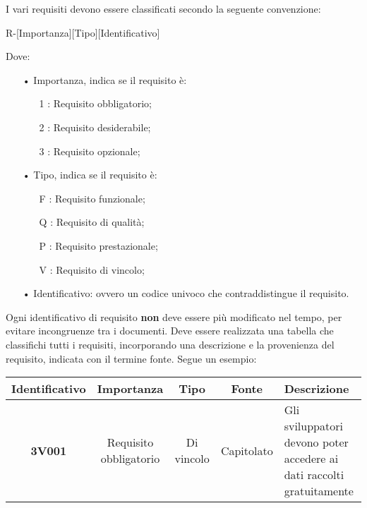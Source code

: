 I vari requisiti devono essere classificati secondo la seguente convenzione:
\begin{center}
R-[Importanza][Tipo][Identificativo]
\end{center}
Dove:
\begin{itemize}
\item[•] Importanza, indica se il requisito è:
\begin{itemize}
\item[1]: {Requisito obbligatorio}\ped;
\item[2]: {Requisito desiderabile}\ped;
\item[3]: {Requisito opzionale}\ped;
\end{itemize}
\item[•] Tipo, indica se il requisito è:
\begin{itemize}
\item[F]: {Requisito funzionale}\ped;
\item[Q]: {Requisito di qualità}\ped;
\item[P]: {Requisito prestazionale}\ped;
\item[V]: {Requisito di vincolo}\ped;
\end{itemize}
\item[•] Identificativo: ovvero un codice univoco che contraddistingue il requisito.
\end{itemize}
Ogni identificativo di requisito \textbf{non} deve essere più modificato nel tempo, per evitare incongruenze tra i documenti.
Deve essere realizzata una tabella che classifichi tutti i requisiti, incorporando una descrizione e la provenienza del requisito, indicata con il termine fonte.
Segue un esempio:
\begin{table}[H]
\centering
\begin{tabularx}{\linewidth}{| c | c | c | c | Z |}
\hline
\textbf{Identificativo} & \textbf{Importanza} & \textbf{Tipo} & \textbf{Fonte} & \textbf{Descrizione} \\
\hline
\textbf{3V001} & Requisito obbligatorio & Di vincolo & Capitolato & Gli sviluppatori devono poter accedere ai dati raccolti gratuitamente \\
\hline
\end{tabularx}
\end{table}
